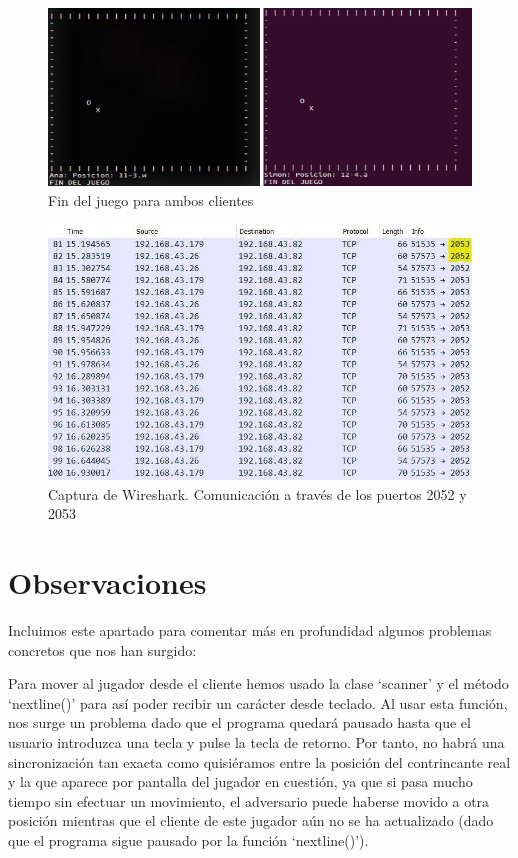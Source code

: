 \begin{figure}[h]
	\centering
	\includegraphics[width=1\textwidth]{img/esta}
	\caption{Fin del juego para ambos clientes}
\end{figure}





\newpage


\begin{figure}[h]
	\centering
	\includegraphics[width=.9\textwidth]{img/7}
	\caption{Captura de Wireshark. Comunicación a través de los puertos 2052 y 2053}
\end{figure}

\newpage

\section{Observaciones}

Incluimos este apartado para comentar más en profundidad algunos problemas concretos que nos han surgido:

Para mover al jugador desde el cliente hemos usado la clase ‘scanner’ y el método \\ ‘nextline()’ para así poder recibir un carácter desde teclado. Al usar esta función, nos surge un problema dado que el programa quedará pausado hasta que el usuario introduzca una tecla y pulse la tecla de retorno. Por tanto, no habrá una sincronización tan exacta como quisiéramos entre la posición del contrincante real y la que aparece por pantalla del jugador en cuestión, ya que si pasa mucho tiempo sin efectuar un movimiento, el adversario puede haberse movido a otra posición mientras que el cliente de este jugador aún no se ha actualizado (dado que el programa sigue pausado por la función ‘nextline()’). \\


